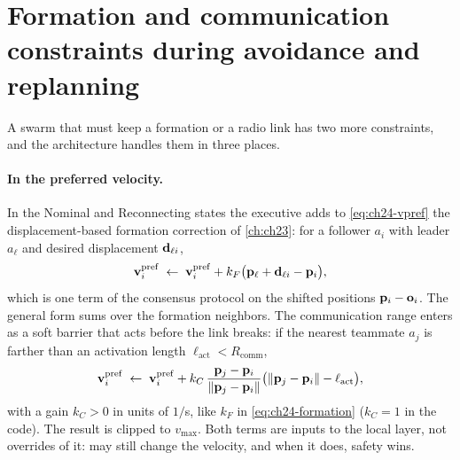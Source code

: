 \section[Formation and communication constraints]{Formation and communication constraints during avoidance and replanning}
\label{sec:ch24-constraints}

A swarm that must keep a formation or a radio link has two more
constraints, and the architecture handles them in three places.

\paragraph{In the preferred velocity.}
In the Nominal and Reconnecting states the executive adds to
\cref{eq:ch24-vpref} the displacement-based formation correction of
\cref{ch:ch23}: for a follower $a_i$ with leader $a_\ell$ and desired
displacement $\mathbf{d}_{\ell i}$,
\begin{equation}
  \mathbf{v}^{\mathrm{pref}}_i \;\gets\; \mathbf{v}^{\mathrm{pref}}_i + k_F\bigl(\mathbf{p}_\ell + \mathbf{d}_{\ell i} - \mathbf{p}_i\bigr),
  \label{eq:ch24-formation}
\end{equation}
which is one term of the consensus protocol on the shifted positions
$\mathbf{p}_i - \mathbf{o}_i$. The general form sums over the formation
neighbors. The communication range enters as a soft barrier that acts
before the link breaks: if the nearest teammate $a_j$ is farther than an
activation length $\ell_{\mathrm{act}} < R_{\mathrm{comm}}$,
\begin{equation}
  \mathbf{v}^{\mathrm{pref}}_i \;\gets\; \mathbf{v}^{\mathrm{pref}}_i + k_C\,\frac{\mathbf{p}_j - \mathbf{p}_i}{\left\lVert \mathbf{p}_j - \mathbf{p}_i \right\rVert}\bigl(\left\lVert \mathbf{p}_j - \mathbf{p}_i \right\rVert - \ell_{\mathrm{act}}\bigr),
  \label{eq:ch24-comm}
\end{equation}
with a gain $k_C > 0$ in units of $1/$s, like $k_F$ in
\cref{eq:ch24-formation} ($k_C = 1$ in the code). The result is clipped to
$v_{\max}$. Both terms are inputs to the local
layer, not overrides of it: \orca may still change the velocity, and when it
does, safety wins.

